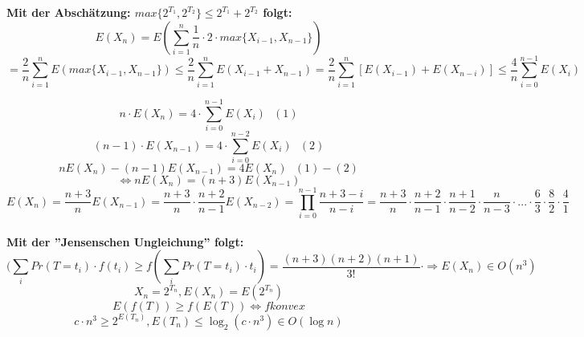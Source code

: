 \textbf{Mit der Abschätzung: $max\{2^{T_1}, 2^{T_2}\} \leq 2^{T_1} + 2^{T_2}$ folgt:}
\[E(X_n) = E(\sum^n_{i=1} \frac{1}{n} \cdot  2 \cdot max\{X_{i-1}, X_{n-1}\}) \]
\[= \frac{2}{n} \sum^n_{i=1} E(max\{X_{i-1}, X_{n-1}\}) \leq \frac{2}{n} \sum^n_{i=1} E(X_{i-1} + X_{n-1}) = \frac{2}{n} \sum^n_{i=1} [E(X_{i-1}) + E(X_{n-i})] \leq \frac{4}{n} \sum^{n-1}_{i=0} E(X_i)\] 

\[ n \cdot E(X_n) = 4 \cdot \sum^{n-1}_{i=0} E(X_i) ~~~(1)\]
\[ (n-1) \cdot E(X_{n-1}) = 4 \cdot \sum^{n-2}_{i=0} E(X_i) ~~~(2)\]
\[ nE(X_n) - (n-1)E(X_{n-1}) = 4E(X_n) ~~~(1)-(2)\]
\[\Leftrightarrow nE(X_n) = (n+3)E(X_{n-1})\]
\[E(X_n)=\frac{n+3}{n}E(X_{n-1})=\frac{n+3}{n} \cdot \frac{n+2}{n-1}E(X_{n-2}) = \prod^{n-1}_{i=0} \frac{n+3-i}{n-i} = \frac{n+3}{n} \cdot \frac{n+2}{n-1} \cdot \frac{n+1}{n-2} \cdot \frac{n}{n-3} \cdot ... \cdot \frac{6}{3} \cdot \frac{8}{2} \cdot \frac{4}{1} \]\\

\textbf{Mit der ''Jensenschen Ungleichung'' folgt:}
\[(\sum_i Pr(T=t_i) \cdot f(t_i) \geq f(\sum_i Pr(T=t_i) \cdot t_i) = \frac{ (n+3)(n+2)(n+1) } { 3!}  \cdot \Rightarrow E(X_n) \in O(n^3)\]
\[X_n = 2^{T_n},  E(X_n) = E(2^{T_n}) \]
\[E(f(T)) \geq f(E(T)) \Leftrightarrow f konvex\]
\[c \cdot n^3 \geq 2^{E(T_n)}, E(T_n) \leq \log_2(c \cdot n^3) \in O(\log n) \]

